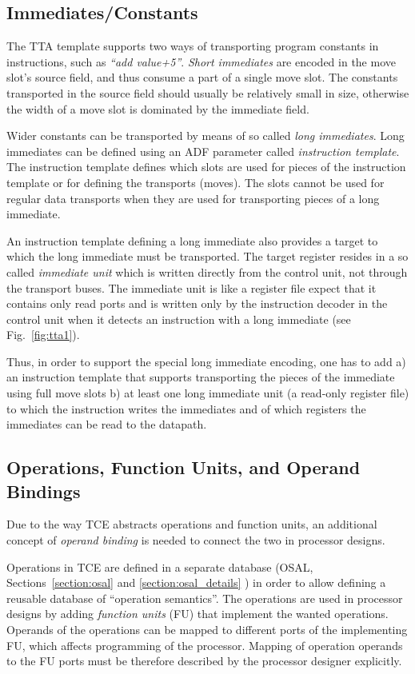 \documentclass[a4paper,twoside]{tceusermanual}
\begin{document}
\subsection{Immediates/Constants}

The TTA template supports two ways of transporting program constants
in instructions, such as \textit{``add value+5''}. \textit{Short
  immediates} are encoded in the move slot's source field, and thus
consume a part of a single move slot. The constants transported in the
source field should usually be relatively small in size, otherwise the
width of a move slot is dominated by the immediate field.

Wider constants can be transported by means of so called \textit{long
  immediates}. Long immediates can be defined using an ADF parameter
called \textit{instruction template}. The instruction template defines
which slots are used for pieces of the instruction template or for
defining the transports (moves).  The slots cannot be used for regular
data transports when they are used for transporting pieces of a long
immediate.

An instruction template defining a long immediate also provides
a target to which the long immediate must be transported. The target register
resides in a so called \textit{immediate unit} which is written directly 
from the control unit, not through the transport buses. The immediate unit is like
a register file expect that it contains only read ports and is written
only by the instruction decoder in the control unit when it detects an 
instruction with a long immediate (see Fig.~\ref{fig:tta1}).

Thus, in order to support the special long immediate encoding, one has
to add a) an instruction template that supports transporting the pieces
of the immediate using full move slots b) at least one long immediate
unit (a read-only register file) to which the instruction writes the
immediates and of which registers the immediates can be read to the
datapath.

\subsection{Operations, Function Units, and Operand Bindings}
Due to the way TCE abstracts operations and function units, an
additional concept of \textit{operand binding} is needed to 
connect the two in processor designs.

Operations in TCE are defined in a separate database (OSAL,
Sections~\ref{section:osal} and \ref{section:osal_details} ) in order
to allow defining a reusable database of ``operation semantics''. The
operations are used in processor designs by adding \textit{function
units} (FU) that implement the wanted operations. Operands of the
operations can be mapped to different ports of the implementing FU,
which affects programming of the processor. Mapping of operation
operands to the FU ports must be therefore described by the processor
designer explicitly.
\end{document}
